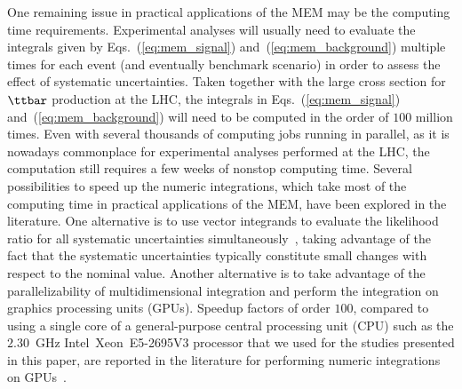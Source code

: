 One remaining issue in practical applications of the MEM may be the computing time requirements.
Experimental analyses will usually need to evaluate the integrals given by Eqs.~(\ref{eq:mem_signal}) and~(\ref{eq:mem_background})
multiple times for each event (and eventually benchmark scenario) 
in order to assess the effect of systematic uncertainties.
Taken together with the large cross section for $\ttbar$ production at the LHC,
the integrals in Eqs.~(\ref{eq:mem_signal}) and~(\ref{eq:mem_background}) will need to be computed in the order of $100$ million times.
Even with several thousands of computing jobs running in parallel,
as it is nowadays commonplace for experimental analyses performed at the LHC,
the computation still requires a few weeks of nonstop computing time.
Several possibilities to speed up the numeric integrations, which take most of the computing time in practical applications of the MEM,
have been explored in the literature.
One alternative is to use vector integrands to evaluate the likelihood ratio for all systematic uncertainties simultaneously~\cite{CUBA},
taking advantage of the fact that the systematic uncertainties typically constitute small changes with respect to the nominal value.
Another alternative is to take advantage of the parallelizability of multidimensional integration and perform the integration on graphics processing units (GPUs).
Speedup factors of order $100$, compared to using a single core of a general-purpose central processing unit (CPU) 
such as the $2.30$~GHz Intel\TReg~Xeon\TReg~E5-2695V3 processor that we used for the studies presented in this paper,
are reported in the literature for performing numeric integrations on GPUs~\cite{Hagiwara:2009aq,Hagiwara:2009cy,Kanzaki:2010ym,Hagiwara:2013oka,Schouten:2014yza,Grasseau:2015vfa}.

